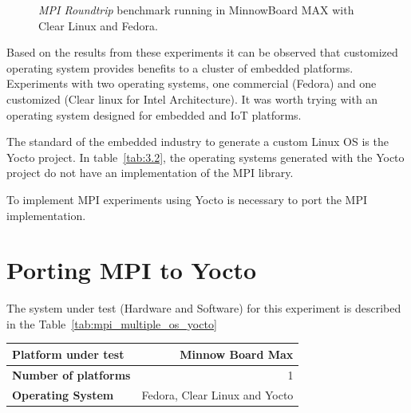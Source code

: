 \begin{figure}[H]
\begin{center}
\end{center}
\caption{\textit{MPI Roundtrip} benchmark running in MinnowBoard MAX with Clear Linux and
Fedora.}
\label{mpi_roundtrip_clr_fedora}
\end{figure}

Based on the results from these experiments it can be observed that customized 
operating system provides benefits to a cluster of embedded platforms. Experiments 
with two operating systems, one commercial (Fedora) and one customized (Clear
linux for Intel Architecture). It was worth trying with an operating system
designed for embedded and IoT platforms. 

The standard of the embedded industry to generate a custom Linux OS
is the Yocto project. In table~\ref{tab:3.2}, the operating systems
generated with the Yocto project do not have an implementation of the MPI
library.

To implement MPI experiments using Yocto is necessary to port the MPI
implementation.


\section{Porting MPI to Yocto}

The system under test (Hardware and Software) for this experiment is described
in the Table~\ref{tab:mpi_multiple_os_yocto}

    \begin{center}
    \begin{tabular}{ | l | r |}
        \hline
        \textbf{Platform under test} & Minnow Board  Max \\ \hline
        \textbf{Number of platforms} & 1  \\ \hline
        \textbf{Operating System} & Fedora, Clear Linux and Yocto  \\ \hline
    \end{tabular}
    \label{tab:mpi_multiple_os_yocto}
    \end{center}

